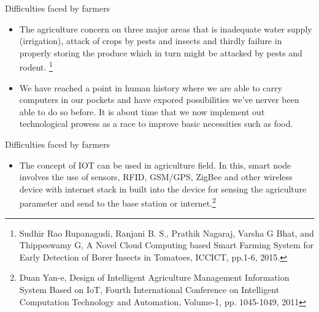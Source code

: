 \documentclass[presentation]{beamer}
\begin{document}
\begin{frame}[label={sec:org6f1bcee}]{Difficulties faced by farmers}
\begin{itemize}
\item The agriculture concern on three major areas that is inadequate water
supply (irrigation), attack of crops by pests and insects and thirdly failure
in properly storing the produce which in turn might be attacked by pests and
rodent. \footnote{Sudhir Rao Rupanagudi, Ranjani B. S., Prathik Nagaraj, Varsha G Bhat,
and Thippeswamy G, A Novel Cloud Computing based Smart Farming System
for Early Detection of Borer Insects in Tomatoes, ICCICT, pp.1-6, 2015.}
\item We have reached a point in human history where we are able
to carry computers in our pockets and have expored
possibilities we've nerver been able to do so before. It is about
time that we now implement out technological prowess as a
race to improve basic necessities such as food.
\end{itemize}
\end{frame}
\begin{frame}[label={sec:orgec7c3e9}]{Difficulties faced by farmers}
\begin{itemize}
\item The concept of IOT can be used in agriculture field. In this,
smart node involves the use of sensors, RFID, GSM/GPS,
ZigBee and other wireless device with internet stack in built
into the device for sensing the agriculture parameter and send
to the base station or internet.\footnote{Duan Yan-e, Design of Intelligent Agriculture Management Information
System Based on IoT, Fourth International Conference on Intelligent
Computation Technology and Automation, Volume-1, pp. 1045-1049, 2011}
\end{itemize}
\end{frame}
\end{document}
